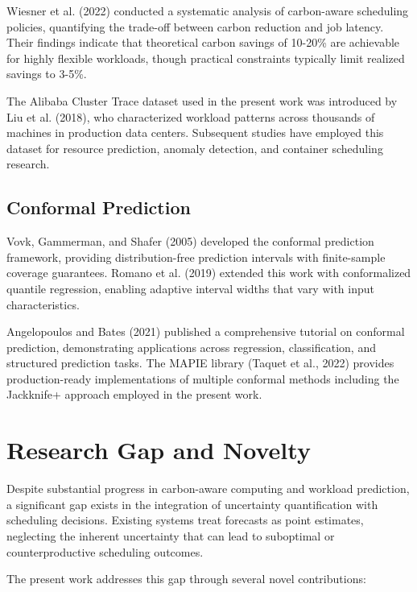 \documentclass[12pt]{report}
\begin{document}
Wiesner et al. (2022) conducted a systematic analysis of carbon-aware scheduling policies, quantifying the trade-off between carbon reduction and job latency. Their findings indicate that theoretical carbon savings of 10-20\% are achievable for highly flexible workloads, though practical constraints typically limit realized savings to 3-5\%.

The Alibaba Cluster Trace dataset used in the present work was introduced by Liu et al. (2018), who characterized workload patterns across thousands of machines in production data centers. Subsequent studies have employed this dataset for resource prediction, anomaly detection, and container scheduling research.

\subsection{Conformal Prediction}

Vovk, Gammerman, and Shafer (2005) developed the conformal prediction framework, providing distribution-free prediction intervals with finite-sample coverage guarantees. Romano et al. (2019) extended this work with conformalized quantile regression, enabling adaptive interval widths that vary with input characteristics.

Angelopoulos and Bates (2021) published a comprehensive tutorial on conformal prediction, demonstrating applications across regression, classification, and structured prediction tasks. The MAPIE library (Taquet et al., 2022) provides production-ready implementations of multiple conformal methods including the Jackknife+ approach employed in the present work.

\section{Research Gap and Novelty}

Despite substantial progress in carbon-aware computing and workload prediction, a significant gap exists in the integration of uncertainty quantification with scheduling decisions. Existing systems treat forecasts as point estimates, neglecting the inherent uncertainty that can lead to suboptimal or counterproductive scheduling outcomes.

The present work addresses this gap through several novel contributions:
\end{document}
